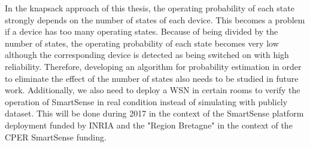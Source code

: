 \par In the knapsack approach of this thesis, the operating probability of each state strongly depends on the number of states of each device. This becomes a problem if a device has too many operating states. Because of being divided by the number of states, the operating probability of each state becomes very low although the corresponding device is detected as being switched on with high reliability. Therefore, developing an algorithm for probability estimation in order to eliminate the effect of the number of states also needs to be studied in future work. Additionally, we also need to deploy a WSN in certain rooms to verify the operation of SmartSense in real condition instead of simulating with publicly dataset. This will be done during 2017 in the context of the SmartSense platform deployment funded by INRIA and the "Region Bretagne" in the context of the CPER SmartSense funding. 
